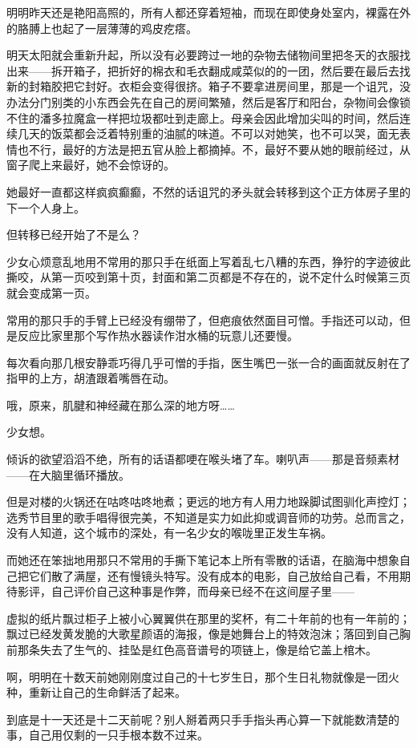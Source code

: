 \documentclass[UTF8, scheme = chinese, openany]{ctexbook}
\begin{document}
明明昨天还是艳阳高照的，所有人都还穿着短袖，而现在即使身处室内，裸露在外的胳膊上也起了一层薄薄的鸡皮疙瘩。

明天太阳就会重新升起，所以没有必要跨过一地的杂物去储物间里把冬天的衣服找出来——拆开箱子，把折好的棉衣和毛衣翻成咸菜似的的一团，然后要在最后去找新的封箱胶把它封好。衣柜会变得很挤。箱子不要拿进房间里，那是一个诅咒，没办法分门别类的小东西会先在自己的房间繁殖，然后是客厅和阳台，杂物间会像锁不住的潘多拉魔盒一样把垃圾都吐到走廊上。母亲会因此增加尖叫的时间，然后连续几天的饭菜都会泛着特别重的油腻的味道。不可以对她笑，也不可以哭，面无表情也不行，最好的方法是把五官从脸上都摘掉。不，最好不要从她的眼前经过，从窗子爬上来最好，她不会惊讶的。

她最好一直都这样疯疯癫癫，不然的话诅咒的矛头就会转移到这个正方体房子里的下一个人身上。

但转移已经开始了不是么？

少女心烦意乱地用不常用的那只手在纸面上写着乱七八糟的东西，狰狞的字迹彼此撕咬，从第一页咬到第十页，封面和第二页都是不存在的，说不定什么时候第三页就会变成第一页。

常用的那只手的手臂上已经没有绷带了，但疤痕依然面目可憎。手指还可以动，但是反应比家里那个写作热水器读作泔水桶的玩意儿还要慢。

每次看向那几根安静乖巧得几乎可憎的手指，医生嘴巴一张一合的画面就反射在了指甲的上方，胡渣跟着嘴唇在动。

哦，原来，肌腱和神经藏在那么深的地方呀……

少女想。

倾诉的欲望滔滔不绝，所有的话语都哽在喉头堵了车。喇叭声——那是音频素材——在大脑里循环播放。

但是对楼的火锅还在咕咚咕咚地煮；更远的地方有人用力地跺脚试图驯化声控灯；选秀节目里的歌手唱得很完美，不知道是实力如此抑或调音师的功劳。总而言之，没有人知道，这个城市的深处，有一名少女的喉咙里正发生车祸。

而她还在笨拙地用那只不常用的手撕下笔记本上所有零散的话语，在脑海中想象自己把它们散了满屋，还有慢镜头特写。没有成本的电影，自己放给自己看，不用期待影评，自己评价自己这种事是作弊，而母亲已经不在这间屋子里——

虚拟的纸片飘过柜子上被小心翼翼供在那里的奖杯，有二十年前的也有一年前的；飘过已经发黄发脆的大歌星颜语的海报，像是她舞台上的特效泡沫；落回到自己胸前那条失去了生气的、挂坠是红色高音谱号的项链上，像是给它盖上棺木。

啊，明明在十数天前她刚刚度过自己的十七岁生日，那个生日礼物就像是一团火种，重新让自己的生命鲜活了起来。

到底是十一天还是十二天前呢？别人掰着两只手手指头再心算一下就能数清楚的事，自己用仅剩的一只手根本数不过来。
\end{document}
